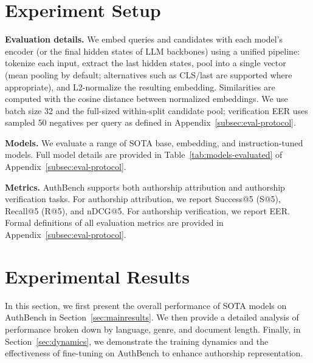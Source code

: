\documentclass[11pt]{article}
\begin{document}
\section{Experiment Setup}
\textbf{Evaluation details.}  We embed queries and candidates with each model’s encoder (or the final hidden states of LLM backbones) using a unified pipeline: tokenize each input, extract the last hidden states, pool into a single vector (mean pooling by default; alternatives such as CLS/last are supported where appropriate), and L2-normalize the resulting embedding. Similarities are computed with the cosine distance between normalized embeddings. We use batch size 32 and the full-sized within-split candidate pool; verification EER uses sampled 50 negatives per query as defined in Appendix~\ref{subsec:eval-protocol}.

\noindent\textbf{Models.} We evaluate a range of SOTA base, embedding, and instruction-tuned models. Full model details are provided in Table~\ref{tab:models-evaluated} of Appendix~\ref{subsec:eval-protocol}.

\noindent\textbf{Metrics.} AuthBench supports both authorship attribution and authorship verification tasks. 
For authorship attribution, we report Success@5 (S@5), Recall@5 (R@5), and nDCG@5. 
For authorship verification, we report EER. 
Formal definitions of all evaluation metrics are provided in Appendix~\ref{subsec:eval-protocol}.

\section{Experimental Results}
\label{sec:experiments}
In this section, we first present the overall performance of SOTA models on AuthBench in Section~\ref{sec:mainresults}. We then provide a detailed analysis of performance broken down by language, genre, and document length. Finally, in Section~\ref{sec:dynamics}, we demonstrate the training dynamics and the effectiveness of fine-tuning on AuthBench to enhance authorship representation.

\end{document}
